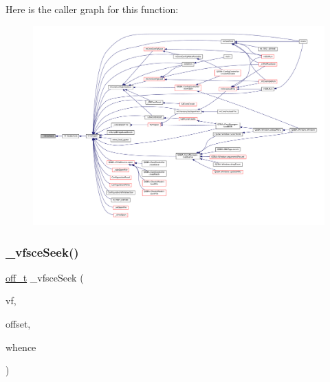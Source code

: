 Here is the caller graph for this function\+:
\nopagebreak
\begin{figure}[H]
\begin{center}
\leavevmode
\includegraphics[width=350pt]{sce-vfs_8c_a69b43cfbd3986b033257e6363f8d531f_icgraph}
\end{center}
\end{figure}
\mbox{\label{sce-vfs_8c_a88279b263254e86a68f5ed9774606e64}} 
\subsubsection{\texorpdfstring{\+\_\+vfsce\+Seek()}{\_vfsceSeek()}}
{\footnotesize\ttfamily \mbox{\hyperlink{__builder_8h_a53066be3c3a28d8b8ccb3dc95c1e49b1}{off\+\_\+t}} \+\_\+vfsce\+Seek (\begin{DoxyParamCaption}\item[{struct V\+File $\ast$}]{vf,  }\item[{\mbox{\hyperlink{__builder_8h_a53066be3c3a28d8b8ccb3dc95c1e49b1}{off\+\_\+t}}}]{offset,  }\item[{\mbox{\hyperlink{ioapi_8h_a787fa3cf048117ba7123753c1e74fcd6}{int}}}]{whence }\end{DoxyParamCaption})\hspace{0.3cm}{\ttfamily [static]}}

